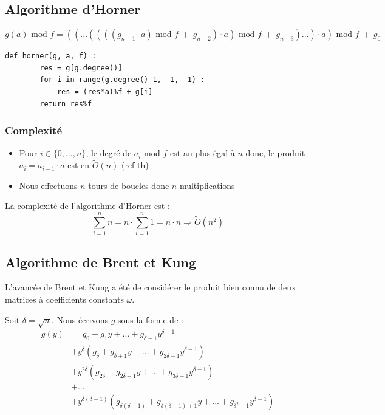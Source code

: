 \documentclass[a4paper]{article}
\begin{document}
\subsection{Algorithme d'Horner}

\[
g(a)\text{ mod }f = ((...((((g_{n-1}\cdot a)\text{ mod }f\ +\ g_{n-2})\cdot a)\text{ mod }f\ +\ g_{n-3})...)\cdot a)\text{ mod }f\ +\ g_0
\]

\begin{lstlisting}[title={Horner}]
    def horner(g, a, f) :
        res = g[g.degree()]
        for i in range(g.degree()-1, -1, -1) :
            res = (res*a)%f + g[i]
        return res%f
\end{lstlisting}

\subsubsection*{Complexité}
\begin{itemize}
    \item Pour $i \in \{0,...,n\}$, le degré de $a_i$ mod $f$ est au plus égal à $n$ donc, le produit $a_i=a_{i-1}\cdot a$ est en $\tilde{O}(n)$ (ref th)
    \item Nous effectuons $n$ tours de boucles donc $n$ multiplications
\end{itemize}
La complexité de l'algorithme d'Horner est :
\[
\sum_{i=1}^n n=n\cdot \sum_{i=1}^n 1 = n\cdot n\Longrightarrow \tilde{O}(n^2)
\]

\subsection{Algorithme de Brent et Kung}

L'avancée de Brent et Kung a été de considérer le produit bien connu de deux matrices à coefficients constants $\omega$.


Soit $\delta = \sqrt{n}$. Nous écrivons $g$ sous la forme de :
\begin{align*}
    g(y) &= g_0 + g_1y + ... + g_{\delta-1}y^{\delta-1} \\
        &+ y^\delta(g_\delta + g_{\delta+1}y + ... + g_{2\delta-1}y^{\delta-1}) \\
                                      &+ y^{2\delta}(g_{2\delta} + g_{2\delta+1}y + ... + g_{3\delta-1}y^{\delta-1}) \\
                                      &+ ... \\
                                      &+ y^{\delta(\delta-1)}(g_{\delta(\delta-1)} + g_{\delta(\delta-1)+1}y + ... + g_{\delta^2-1}y^{\delta-1}) 
\end{align*}
\end{document}
